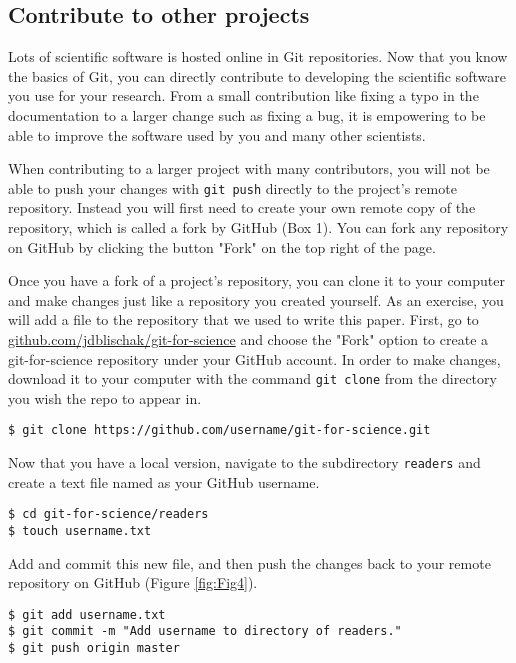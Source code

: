 \subsection{Contribute to other projects}

Lots of scientific software is hosted online in Git repositories.
Now that you know the basics of Git, you can directly contribute to developing the scientific software you use for your research.
From a small contribution like fixing a typo in the documentation to a larger change such as fixing a bug, it is empowering to be able to improve the software used by you and many other scientists.

When contributing to a larger project with many contributors, you will not be able to push your changes with \verb|git push| directly to the project's remote repository.
Instead you will first need to create your own remote copy of the repository, which is called a fork by GitHub (Box 1).
You can fork any repository on GitHub by clicking the button "Fork" on the top right of the page.

Once you have a fork of a project's repository, you can clone it to your computer and make changes just like a repository you created yourself.
As an exercise, you will add a file to the repository that we used to write this paper.
First, go to \href{https://github.com/jdblischak/git-for-science}{github.com/jdblischak/git-for-science} and choose the "Fork" option to create a git-for-science repository under your GitHub account.
In order to make changes, download it to your computer with the command \verb|git clone| from the directory you wish the repo to appear in.

\begin{lstlisting}
$ git clone https://github.com/username/git-for-science.git
\end{lstlisting}

Now that you have a local version, navigate to the subdirectory \verb|readers| and create a text file named as your GitHub username.

\begin{lstlisting}
$ cd git-for-science/readers
$ touch username.txt
\end{lstlisting}

Add and commit this new file, and then push the changes back to your remote repository on GitHub (Figure \ref{fig:Fig4}).

\begin{lstlisting}
$ git add username.txt
$ git commit -m "Add username to directory of readers."
$ git push origin master
\end{lstlisting}


